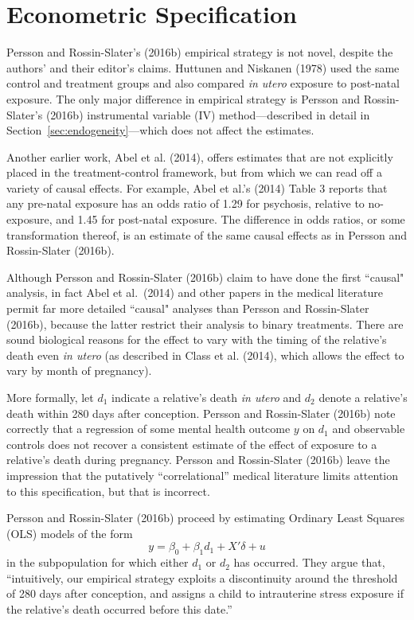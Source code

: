 \documentclass[a4paper,12pt]{article}
\begin{document}


\section{Econometric Specification }

Persson and Rossin-Slater's (2016b) empirical strategy is not novel, despite the authors' and their editor's claims.  Huttunen and Niskanen (1978) used the same control and treatment groups and also compared \emph{in utero} exposure to post-natal exposure. The only major difference in empirical strategy  is Persson and Rossin-Slater's (2016b) instrumental variable (IV) method---described in detail in Section~\ref{sec:endogeneity}---which does not affect the estimates.

Another earlier work, Abel et al. (2014), offers estimates that are not explicitly placed in the treatment-control framework, but from which we can read off a variety of causal effects. For example, Abel et al.'s (2014) Table 3 reports that any pre-natal exposure has an odds ratio of 1.29 for psychosis, relative to no-exposure, and 1.45 for post-natal exposure. The difference in odds ratios, or some transformation thereof, is an estimate of the same causal effects as in Persson and Rossin-Slater (2016b).

Although Persson and Rossin-Slater (2016b) claim to have done the first ``causal" analysis, in fact Abel et al.~(2014) and other papers in the medical literature permit far more detailed ``causal" analyses than Persson and Rossin-Slater (2016b), because the latter restrict their analysis to binary treatments. There are sound biological reasons for the effect to vary with the timing of the relative's death even \emph{in utero} (as described in Class et al. (2014), which allows the effect to vary by month of pregnancy).

More formally, let $d_1$ indicate a relative's death \emph{in utero} and $d_2$ denote a relative's death within 280 days after conception. Persson and Rossin-Slater (2016b) note correctly that a regression of some mental health outcome $y$ on $d_1$ and observable controls does not recover a consistent estimate of the effect of exposure to a relative's death during pregnancy. Persson and Rossin-Slater (2016b)  leave the impression that the putatively ``correlational'' medical literature limits attention to this specification, but that is incorrect.

Persson and Rossin-Slater (2016b) proceed by  estimating Ordinary Least Squares (OLS) models of the form
  \[
    y=\beta_0+\beta_1d_1+X'\delta+u
  \]
in the subpopulation for which either $d_1$ or $d_2$ has occurred. They argue that, ``intuitively, our empirical strategy exploits a discontinuity around the threshold of 280 days after conception, and assigns a child to intrauterine stress exposure if the relative’s death occurred before this date.''
\end{document}
